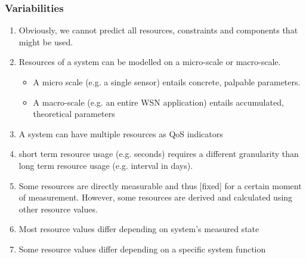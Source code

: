 \subsubsection{Variabilities}
\begin{enumerate}[label=V\rumid .\arabic*]
\item \label{v:obvious} Obviously, we cannot predict all resources, constraints and components that might be used.
\item \label{v:micr_macro} Resources of a system can be modelled on a micro-scale or macro-scale.
\begin{itemize}
\item A micro scale (e.g. a single sensor) entails concrete, palpable parameters.
\item A macro-scale (e.g. an entire WSN application) entails accumulated, theoretical parameters
\end{itemize}
\item \label{v:nr_optimizer} A system can have multiple resources as QoS indicators
\item \label{v:granularity} short term resource usage (e.g. seconds) requires a different granularity than long term resource usage (e.g. interval in days).
\item \label{v:measure_vs_derive} Some resources are directly measurable and thus [fixed] for a certain moment of measurement. However, some resources are derived and calculated using other resource values. \cite{feature_model}
\item \label{v:state} Most resource values differ depending on system's measured state
\item \label{v:function} Some resource values differ depending on a specific system function
\end{enumerate}

